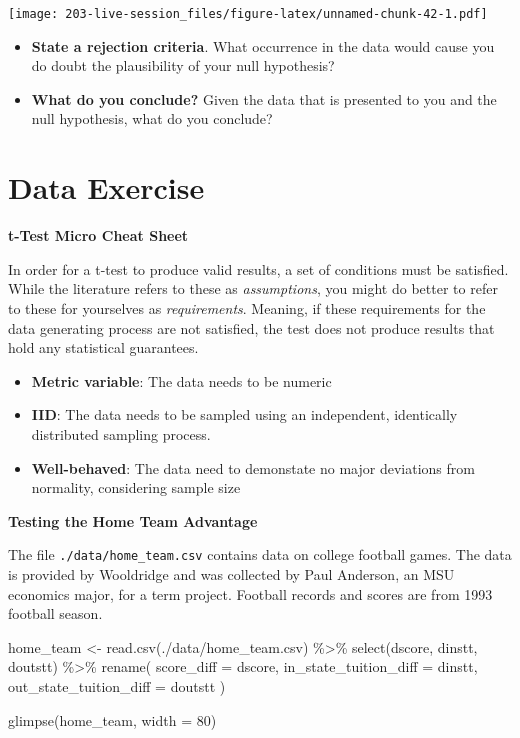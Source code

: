 \documentclass[
]{book}
\newenvironment{Shaded}{\begin{snugshade}}{\end{snugshade}}
\newcommand{\AttributeTok}[1]{\textcolor[rgb]{0.77,0.63,0.00}{#1}}
\newcommand{\DecValTok}[1]{\textcolor[rgb]{0.00,0.00,0.81}{#1}}
\newcommand{\FunctionTok}[1]{\textcolor[rgb]{0.00,0.00,0.00}{#1}}
\newcommand{\NormalTok}[1]{#1}
\newcommand{\OtherTok}[1]{\textcolor[rgb]{0.56,0.35,0.01}{#1}}
\newcommand{\SpecialCharTok}[1]{\textcolor[rgb]{0.00,0.00,0.00}{#1}}
\newcommand{\StringTok}[1]{\textcolor[rgb]{0.31,0.60,0.02}{#1}}
\providecommand{\tightlist}{%
  \setlength{\itemsep}{0pt}\setlength{\parskip}{0pt}}
\theoremstyle{definition}
\theoremstyle{definition}
\theoremstyle{definition}
\theoremstyle{definition}
\theoremstyle{remark}
\begin{document}
\texttt{[image: 203-live-session\_files/figure-latex/unnamed-chunk-42-1.pdf]}

\begin{itemize}
\item
  \textbf{State a rejection criteria}. What occurrence in the data would cause you do doubt the plausibility of your null hypothesis?
\item
  \textbf{What do you conclude?} Given the data that is presented to you and the null hypothesis, what do you conclude?
\end{itemize}

\hypertarget{data-exercise}{%
\section{Data Exercise}\label{data-exercise}}

\textbf{t-Test Micro Cheat Sheet}

In order for a t-test to produce valid results, a set of conditions must be satisfied. While the literature refers to these as \emph{assumptions}, you might do better to refer to these for yourselves as \emph{requirements}. Meaning, if these requirements for the data generating process are not satisfied, the test does not produce results that hold any statistical guarantees.

\begin{itemize}
\tightlist
\item
  \textbf{Metric variable}: The data needs to be numeric
\item
  \textbf{IID}: The data needs to be sampled using an independent, identically distributed sampling process.
\item
  \textbf{Well-behaved}: The data need to demonstate no major deviations from normality, considering sample size
\end{itemize}

\textbf{Testing the Home Team Advantage}

The file \texttt{./data/home\_team.csv} contains data on college football games. The data is provided by Wooldridge and was collected by Paul Anderson, an MSU economics major, for a term project. Football records and scores are from 1993 football season.

\begin{Shaded}
\begin{Highlighting}[]
\NormalTok{home\_team }\OtherTok{\textless{}{-}} \FunctionTok{read.csv}\NormalTok{(}\StringTok{\textquotesingle{}./data/home\_team.csv\textquotesingle{}}\NormalTok{) }\SpecialCharTok{\%\textgreater{}\%} 
  \FunctionTok{select}\NormalTok{(dscore, dinstt, doutstt) }\SpecialCharTok{\%\textgreater{}\%} 
  \FunctionTok{rename}\NormalTok{(}
    \AttributeTok{score\_diff               =}\NormalTok{ dscore, }
    \AttributeTok{in\_state\_tuition\_diff    =}\NormalTok{ dinstt, }
    \AttributeTok{out\_state\_tuition\_diff   =}\NormalTok{ doutstt}
\NormalTok{  )}

\FunctionTok{glimpse}\NormalTok{(home\_team, }\AttributeTok{width =} \DecValTok{80}\NormalTok{)}
\end{Highlighting}
\end{Shaded}
\end{document}
